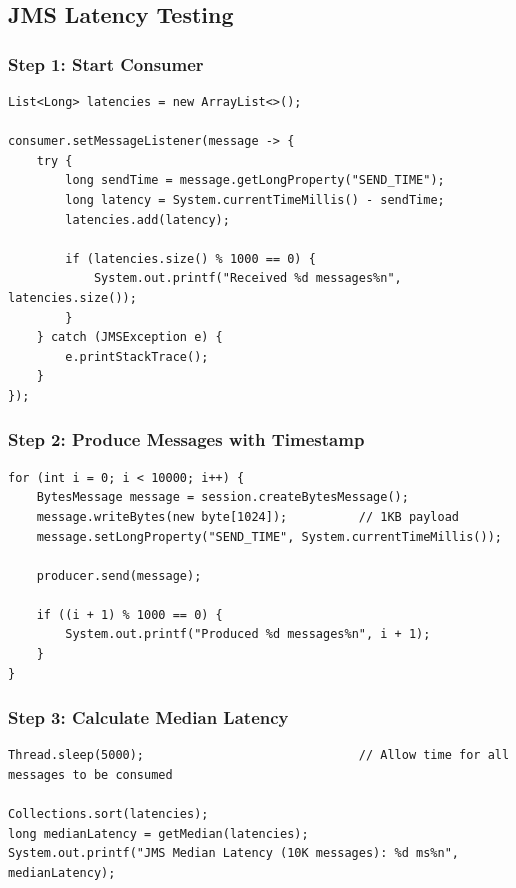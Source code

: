 \documentclass[11pt,a4paper]{article}
\begin{document}
\subsection{JMS Latency Testing}

\subsubsection{Step 1: Start Consumer}
\begin{lstlisting}[style=javastyle, caption=JMS Consumer with Latency Tracking]
List<Long> latencies = new ArrayList<>();

consumer.setMessageListener(message -> {
    try {
        long sendTime = message.getLongProperty("SEND_TIME");
        long latency = System.currentTimeMillis() - sendTime;
        latencies.add(latency);
        
        if (latencies.size() % 1000 == 0) {
            System.out.printf("Received %d messages%n", latencies.size());
        }
    } catch (JMSException e) {
        e.printStackTrace();
    }
});
\end{lstlisting}

\subsubsection{Step 2: Produce Messages with Timestamp}
\begin{lstlisting}[style=javastyle, caption=JMS Producer with Timestamp]
for (int i = 0; i < 10000; i++) {
    BytesMessage message = session.createBytesMessage();
    message.writeBytes(new byte[1024]);          // 1KB payload
    message.setLongProperty("SEND_TIME", System.currentTimeMillis());
    
    producer.send(message);
    
    if ((i + 1) % 1000 == 0) {
        System.out.printf("Produced %d messages%n", i + 1);
    }
}
\end{lstlisting}

\subsubsection{Step 3: Calculate Median Latency}
\begin{lstlisting}[style=javastyle, caption=JMS Latency Calculation]
Thread.sleep(5000);                              // Allow time for all messages to be consumed

Collections.sort(latencies);
long medianLatency = getMedian(latencies);
System.out.printf("JMS Median Latency (10K messages): %d ms%n", medianLatency);
\end{lstlisting}
\end{document}
